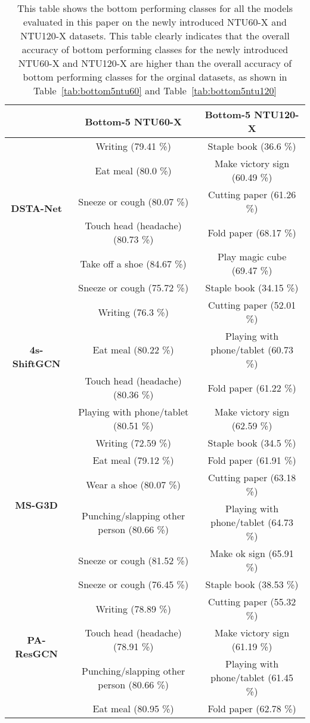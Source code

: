\documentclass[sigconf,screen,prologue,table,dvipsnames]{acmart}
\begin{document}
\begin{table*}[]
\resizebox{0.9\linewidth}{!}
 {\centering 
 \begin{tabular}{c|c|c}
 \toprule
             & \textbf{Bottom-5 NTU60-X} & \textbf{Bottom-5 NTU120-X}\\    
 \midrule
    \multirow{5}{5em}{\textbf{\centering DSTA-Net
    \cite{dstanet_accv2020}}} 
    & Writing (79.41 \%) & Staple book (36.6 \%)\\
    & Eat meal (80.0 \%) & Make victory sign (60.49 \%)\\
    & Sneeze or cough (80.07 \%) & Cutting paper (61.26 \%)\\
    & Touch head (headache) (80.73 \%) & Fold paper (68.17 \%)\\
    & Take off a shoe (84.67 \%) & Play magic cube (69.47 \%)\\
    \midrule
    \multirow{5}{5em}{\textbf{\centering 4s-ShiftGCN
    \cite{cheng2020shiftgcn}}}
    & Sneeze or cough (75.72 \%) & Staple book (34.15 \%)\\
    & Writing (76.3 \%) & Cutting paper (52.01 \%)\\
    & Eat meal (80.22 \%) & Playing with phone/tablet (60.73 \%)\\
    & Touch head (headache) (80.36 \%) & Fold paper (61.22 \%)\\
    & Playing with phone/tablet (80.51 \%) & Make victory sign (62.59 \%)\\
    \midrule
    \multirow{5}{5em}{\textbf{\centering MS-G3D
    \cite{liu2020disentangling}}}
    & Writing (72.59 \%) & Staple book (34.5 \%)\\
    & Eat meal (79.12 \%) & Fold paper (61.91 \%)\\
    & Wear a shoe (80.07 \%) & Cutting paper (63.18 \%)\\
    & Punching/slapping other person (80.66 \%) & Playing with phone/tablet (64.73 \%)\\
    & Sneeze or cough (81.52 \%) & Make ok sign (65.91 \%)\\
    \midrule
    \multirow{5}{5em}{\textbf{\centering PA-ResGCN
    \cite{song2020stronger}}}
    & Sneeze or cough (76.45 \%) & Staple book (38.53 \%)\\
    & Writing (78.89 \%) & Cutting paper (55.32 \%)\\
    & Touch head (headache) (78.91 \%) & Make victory sign (61.19 \%)\\
    & Punching/slapping other person (80.66 \%) & Playing with phone/tablet (61.45 \%)\\
    & Eat meal (80.95 \%) & Fold paper (62.78 \%)\\
  \bottomrule
 \end{tabular}
  }
\caption{\label{tab:bottom5ntux} This table shows the bottom performing classes for all the models evaluated in this paper on the newly introduced NTU60-X and NTU120-X datasets. This table clearly indicates that the overall accuracy of bottom performing classes for the newly introduced NTU60-X and NTU120-X are higher than the overall accuracy of bottom performing classes for the orginal datasets, as shown in Table~\ref{tab:bottom5ntu60} and Table~\ref{tab:bottom5ntu120}}
\end{table*}
\end{document}
